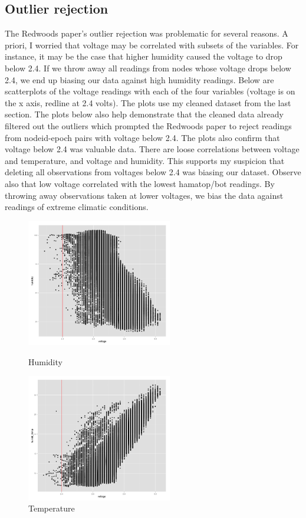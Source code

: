 \documentclass[english]{article}\usepackage[]{graphicx}\usepackage[]{color}
\begin{document}
\subsection{Outlier rejection}
The Redwoods paper's outlier rejection was problematic for several reasons. A priori, I worried that voltage may be correlated with subsets of the variables. For instance, it may be the case that higher humidity caused the voltage to drop below 2.4. If we throw away all readings from nodes whose voltage drops below 2.4, we end up biasing our data against high humidity readings.  Below are scatterplots of the voltage readings with each of the four variables (voltage is on the x axis, redline at 2.4 volts). The plots use my cleaned dataset from the last section. The plots below also help demonstrate that the cleaned data already filtered out the outliers which prompted the Redwoods paper to reject readings from nodeid-epoch pairs with voltage below 2.4. The plots also confirm that voltage below 2.4 was valuable data. There are loose correlations between voltage and temperature, and voltage and humidity.  This supports my suspicion that deleting all observations from voltages below 2.4 was biasing our dataset. Observe also that low voltage correlated with the lowest hamatop/bot readings.  By throwing away observations taken at lower voltages, we bias the data against readings of extreme climatic conditions.  


\begin{figure}[H]
\centering
\begin{minipage}{.50\textwidth}
\centering
\includegraphics[width=180pt]{volthumid}
\vspace{-15pt}
\caption{Humidity}
\vspace{-10pt}
\end{minipage}\hfill
\begin{minipage}{.50\textwidth}
\centering
\includegraphics[width=180pt]{volttemp}
\vspace{-15pt}
\caption{Temperature}
\vspace{-10pt}
\end{minipage}\hfill
\end{figure}
\end{document}
